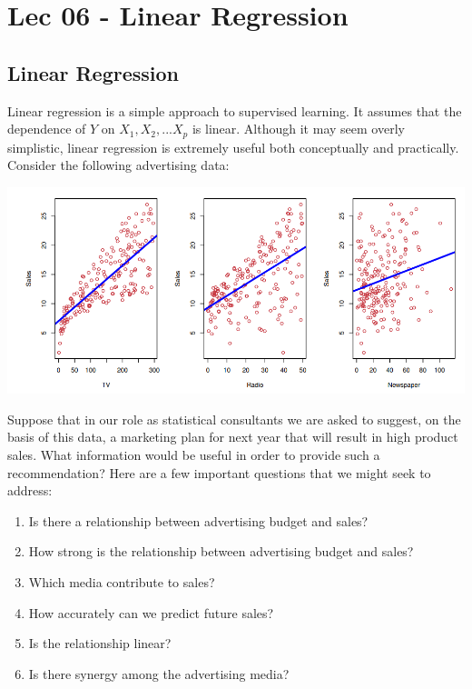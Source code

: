 \chapter{Lec 06 - Linear Regression}

\section{Linear Regression}
Linear regression is a simple approach to supervised learning. It assumes that the dependence of $Y$ on $X_1, X_2, . . . X_p$ is linear. Although it may seem overly simplistic, linear regression is extremely useful both conceptually and practically. Consider the following advertising data:
\begin{center}
    \includegraphics[scale=0.7]{images/advertising_lr.png}
\end{center}
Suppose that in our role as statistical consultants we are asked to suggest, on the basis of this data, a marketing plan for next year that will result in high product sales. What information would be useful in order to provide such a recommendation? Here are a few important questions that we might seek to address:
\begin{enumerate}
    \item Is there a relationship between advertising budget and sales?

    \item How strong is the relationship between advertising budget and sales?

    \item Which media contribute to sales?

    \item How accurately can we predict future sales?

    \item Is the relationship linear?

    \item Is there synergy among the advertising media?
\end{enumerate}
